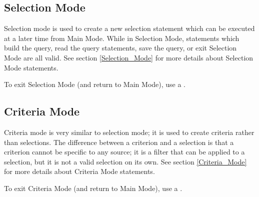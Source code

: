 \subsection{Selection Mode}

Selection mode is used to create a new selection statement which can be executed at a later time from Main Mode.
While in Selection Mode, statements which build the query, read the query statements, save the query, or exit
Selection Mode are all valid. See section \ref{Selection_Mode} for more details about Selection Mode statements.

To exit Selection Mode (and return to Main Mode), use a .

\subsection{Criteria Mode}
Criteria mode is very similar to selection mode; it is used to create criteria rather than selections.
The difference between a criterion and a selection is that a criterion cannot be specific to any source;
it is a filter that can be applied to a selection, but it is not a valid selection on its own.
See section \ref{Criteria_Mode} for more details about Criteria Mode statements.

To exit Criteria Mode (and return to Main Mode), use a .
